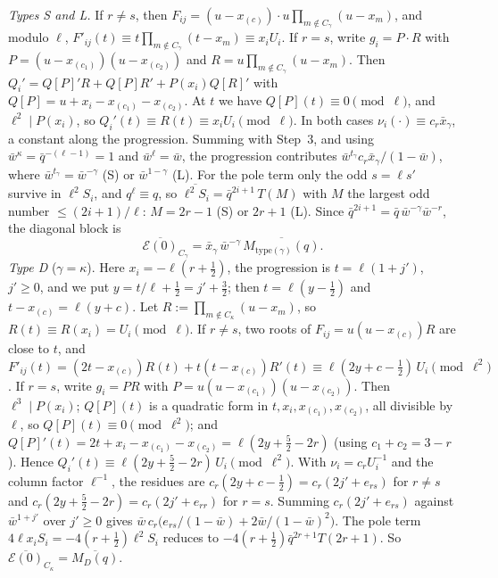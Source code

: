 \documentclass[11pt]{amsart}
\theoremstyle{definition}
\theoremstyle{remark}
\numberwithin{equation}{section}
\begin{document}
\emph{Types S and L.} If $r\ne s$, then
$F_{ij}=(u-x_{(c)})\cdot u\prod_{m\notin C_\gamma}(u-x_m)$, and modulo $\ell$, $F'_{ij}(t)\equiv t\prod_{m\notin C_\gamma}(t-x_m)\equiv x_iU_i$.
If $r=s$, write $g_i=P\cdot R$ with $P=(u-x_{(c_1)})(u-x_{(c_2)})$ and $R=u\prod_{m\notin C_\gamma}(u-x_m)$. Then
$Q_i'=Q[P]'R+Q[P]R'+P(x_i)Q[R]'$ with $Q[P]=u+x_i-x_{(c_1)}-x_{(c_2)}$. At $t$ we have $Q[P](t)\equiv0\pmod\ell$, and
$\ell^2\mid P(x_i)$, so $Q_i'(t)\equiv R(t)\equiv x_iU_i\pmod\ell$. In both cases $\nu_i(\cdot)\equiv c_r\bar x_\gamma$, a constant along
the progression. Summing with Step~3, and using $\bar w^\kappa=\bar q^{-(\ell-1)}=1$ and $\bar w^\ell=\bar w$, the progression
contributes $\bar w^{t_\gamma}c_r\bar x_\gamma/(1-\bar w)$, where $\bar w^{t_\gamma}=\bar w^{-\gamma}$ (S) or $\bar w^{1-\gamma}$ (L). For
the pole term only the odd $s=\ell s'$ survive in $\ell^2S_i$, and $q^\ell\equiv q$, so
$\overline{\ell^2S_i}=\bar q^{2i+1}\,T(M)$ with $M$ the largest odd number $\le(2i+1)/\ell$: $M=2r-1$ (S) or $2r+1$ (L). Since
$\bar q^{2i+1}=\bar q\,\bar w^{-\gamma}\bar w^{-r}$, the diagonal block is
\[
  \overline{\mathcal E(0)}_{C_\gamma}=\bar x_\gamma\,\bar w^{-\gamma}\,\overline{M_{\mathrm{type}(\gamma)}(q)} .
\]
\emph{Type D} ($\gamma=\kappa$). Here $x_i=-\ell(r+\frac12)$, the progression is $t=\ell(1+j')$, $j'\ge0$, and we put
$y=t/\ell+\frac12=j'+\frac32$; then $t=\ell(y-\frac12)$ and $t-x_{(c)}=\ell(y+c)$. Let
$R:=\prod_{m\notin C_\kappa}(u-x_m)$, so $R(t)\equiv R(x_i)=U_i\pmod\ell$. If $r\ne s$, two roots of $F_{ij}=u(u-x_{(c)})R$ are close
to $t$, and $F'_{ij}(t)=(2t-x_{(c)})R(t)+t(t-x_{(c)})R'(t)\equiv\ell(2y+c-\frac12)\,U_i\pmod{\ell^2}$. If $r=s$, write
$g_i=PR$ with $P=u(u-x_{(c_1)})(u-x_{(c_2)})$. Then $\ell^3\mid P(x_i)$; $Q[P](t)$ is a quadratic form in
$t,x_i,x_{(c_1)},x_{(c_2)}$, all divisible by $\ell$, so $Q[P](t)\equiv0\pmod{\ell^2}$; and $Q[P]'(t)=2t+x_i-x_{(c_1)}-x_{(c_2)}=\ell(2y+\frac52-2r)$ (using $c_1+c_2=3-r$).
Hence $Q_i'(t)\equiv\ell(2y+\frac52-2r)\,U_i\pmod{\ell^2}$. With $\nu_i=c_rU_i^{-1}$ and the column factor $\ell^{-1}$, the
residues are $c_r(2y+c-\frac12)=c_r(2j'+e_{rs})$ for $r\ne s$ and $c_r(2y+\frac52-2r)=c_r(2j'+e_{rr})$ for $r=s$. Summing
$c_r(2j'+e_{rs})$ against $\bar w^{1+j'}$ over $j'\ge0$ gives $\bar w\,c_r\bigl(e_{rs}/(1-\bar w)+2\bar w/(1-\bar w)^2\bigr)$.
The pole term $4\ell x_iS_i=-4(r+\frac12)\ell^2S_i$ reduces to
$-4(r+\frac12)\bar q^{2r+1}T(2r+1)$. So $\overline{\mathcal E(0)}_{C_\kappa}=\overline{M_D(q)}$.
\end{document}
